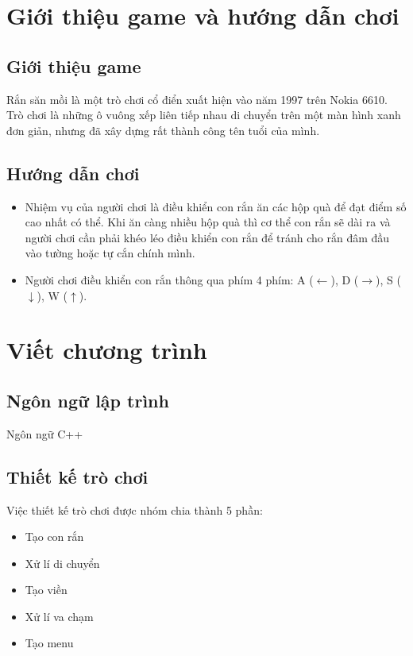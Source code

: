 \documentclass[../main-report.tex]{subfiles}
\begin{document}
\section{Giới thiệu game và hướng dẫn chơi}
\subsection{Giới thiệu game}
Rắn săn mồi là một trò chơi cổ điển xuất hiện vào năm 1997 trên Nokia 6610. Trò chơi là những ô vuông xếp liên tiếp nhau di chuyển trên một màn hình xanh đơn giản, nhưng đã xây dựng rất thành công tên tuổi của mình.

\subsection{Hướng dẫn chơi}

\begin{itemize}
\item Nhiệm vụ của người chơi là điều khiển con rắn ăn các hộp quà để đạt điểm số cao nhất có thể. Khi ăn càng nhiều hộp quà thì cơ thể con rắn sẽ dài ra và người chơi cần phải khéo léo điều khiển con rắn để tránh cho rắn đâm đầu vào tường hoặc tự cắn chính mình.
\end{itemize}

\begin{itemize}
\item Người chơi điều khiển con rắn thông qua phím 4 phím: A ($\leftarrow$), D ($\rightarrow$), S ($\downarrow$), W ($\uparrow$).
\end{itemize}

\section{Viết chương trình}
\subsection{Ngôn ngữ lập trình}
Ngôn ngữ C++
\subsection{Thiết kế trò chơi}
Việc thiết kế trò chơi được nhóm chia thành 5 phần:
\begin{itemize}
    \item Tạo con rắn
    \item Xử lí di chuyển
    \item Tạo viền
    \item Xử lí va chạm
    \item Tạo menu
\end{itemize}
\end{document}

